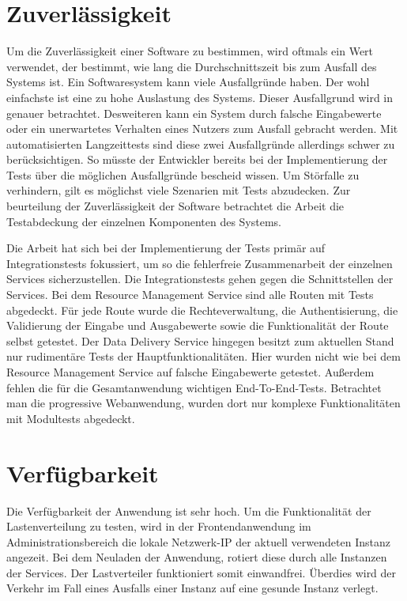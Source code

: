 \section{Zuverlässigkeit}
\label{sec:zuverlaessigkeit}
Um die Zuverlässigkeit einer Software zu bestimmen, wird oftmals ein Wert verwendet,
der bestimmt, wie lang die Durchschnittszeit bis zum Ausfall des Systems ist.\cite[S. 9]{SoftwareQualitaet}
Ein Softwaresystem kann viele Ausfallgründe haben. Der wohl einfachste ist eine zu hohe Auslastung des Systems.
Dieser Ausfallgrund wird in  genauer betrachtet. Desweiteren kann ein System durch falsche
Eingabewerte oder ein unerwartetes Verhalten eines Nutzers zum Ausfall gebracht werden. Mit automatisierten Langzeittests
sind diese zwei Ausfallgründe allerdings schwer zu berücksichtigen. So müsste der Entwickler bereits bei der Implementierung
der Tests über die möglichen Ausfallgründe bescheid wissen. Um Störfalle zu verhindern, gilt es möglichst viele Szenarien mit
Tests abzudecken. Zur beurteilung der Zuverlässigkeit der Software betrachtet die Arbeit die Testabdeckung der einzelnen Komponenten
des Systems.

Die Arbeit hat sich bei der Implementierung der Tests primär auf Integrationstests fokussiert, um so die fehlerfreie 
Zusammenarbeit der einzelnen Services sicherzustellen. Die Integrationstests gehen gegen die Schnittstellen der Services.
Bei dem Resource Management Service sind alle Routen mit Tests abgedeckt. Für jede Route wurde die Rechteverwaltung,
die Authentisierung, die Validierung der Eingabe und Ausgabewerte sowie die Funktionalität der Route selbst getestet.
Der Data Delivery Service hingegen besitzt zum aktuellen Stand nur rudimentäre Tests der Hauptfunktionalitäten.
Hier wurden nicht wie bei dem Resource Management Service auf falsche Eingabewerte getestet. Außerdem fehlen die für
die Gesamtanwendung wichtigen End-To-End-Tests. Betrachtet man die progressive Webanwendung, wurden dort nur komplexe
Funktionalitäten mit Modultests abgedeckt.

\section{Verfügbarkeit}
\label{sec:verfuegbarkeit}
Die Verfügbarkeit der Anwendung ist sehr hoch. Um die Funktionalität der Lastenverteilung
zu testen, wird in der Frontendanwendung im Administrationsbereich die lokale Netzwerk-IP
der aktuell verwendeten Instanz angezeit. Bei dem Neuladen der Anwendung, rotiert diese
durch alle Instanzen der Services. Der Lastverteiler funktioniert somit einwandfrei.
Überdies wird der Verkehr im Fall eines Ausfalls einer Instanz auf eine gesunde
Instanz verlegt.

